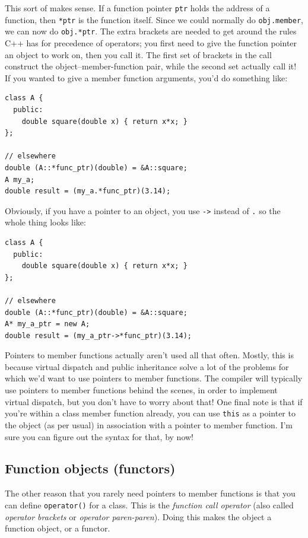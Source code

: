 \documentclass[a4paper]{scrartcl}
\begin{document}
This sort of makes sense. If a function pointer \texttt{ptr} holds the address of a function, then \verb|*ptr| is the function itself. Since we could normally do \verb|obj.member|, we can now do \verb|obj.*ptr|. The extra brackets are needed to get around the rules C++ has for precedence of operators; you first need to give the function pointer an object to work on, then you call it. The first set of brackets in the call construct the object--member-function pair, while the second set actually call it! If you wanted to give a member function arguments, you'd do something like:
\begin{verbatim}
class A {
  public:
    double square(double x) { return x*x; }
};

// elsewhere
double (A::*func_ptr)(double) = &A::square;
A my_a;
double result = (my_a.*func_ptr)(3.14);
\end{verbatim}

Obviously, if you have a pointer to an object, you use \verb|->| instead of \verb|.| so the whole thing looks like:
\begin{verbatim}
class A {
  public:
    double square(double x) { return x*x; }
};

// elsewhere
double (A::*func_ptr)(double) = &A::square;
A* my_a_ptr = new A;
double result = (my_a_ptr->*func_ptr)(3.14);
\end{verbatim}

Pointers to member functions actually aren't used all that often. Mostly, this is because virtual dispatch and public inheritance solve a lot of the problems for which we'd want to use pointers to member functions. The compiler will typically use pointers to member functions behind the scenes, in order to implement virtual dispatch, but you don't have to worry about that! One final note is that if you're within a class member function already, you can use \verb|this| as a pointer to the object (as per usual) in association with a pointer to member function. I'm sure you can figure out the syntax for that, by now!

\subsection{Function objects (functors)}
The other reason that you rarely need pointers to member functions is that you can define \verb|operator()| for a class. This is the \emph{function call operator} (also called \emph{operator brackets} or \emph{operator paren-paren}). Doing this makes the object a function object, or a functor.
\end{document}
